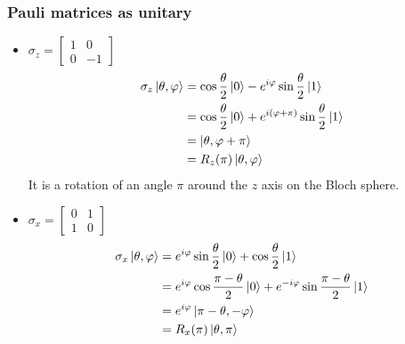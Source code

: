 \documentclass{article}
\begin{document}
\subsubsection*{Pauli matrices as unitary}

\begin{itemize}[label=-]
    \item $\sigma_z = \begin{bmatrix} 1 & 0 \\ 0 & -1 \end{bmatrix}$
    \begin{equation}
        \begin{aligned}
            \sigma_z\ket{\theta, \varphi}
                & = \cos \frac{\theta}{2}\ket{0} - e^{i\varphi}\sin\frac{\theta}{2}\ket{1} \\
                & = \cos \frac{\theta}{2}\ket{0} + e^{i(\varphi + \pi)}\sin\frac{\theta}{2}\ket{1} \\
                & = \ket{\theta, \varphi + \pi} \\
                & = R_z(\pi)\ket{\theta, \varphi}
        \end{aligned}
    \end{equation}
    It is a rotation of an angle $\pi$ around the $z$ axis on the Bloch sphere.

    \item $\sigma_x = \begin{bmatrix} 0 & 1 \\ 1 & 0 \end{bmatrix}$
    \begin{equation}
        \begin{aligned}
            \sigma_x\ket{\theta, \varphi}
                & = e^{i\varphi}\sin\frac{\theta}{2}\ket{0} + \cos\frac{\theta}{2}\ket{1} \\
                & = e^{i\varphi}\cos\frac{\pi-\theta}{2}\ket{0} +
                e^{-i\varphi}\sin\frac{\pi-\theta}{2}\ket{1} \\
                & = e^{i\varphi}\ket{\pi - \theta, -\varphi} \\
                & = R_x(\pi)\ket{\theta, \pi}
        \end{aligned}
    \end{equation}


\end{itemize}
\end{document}
